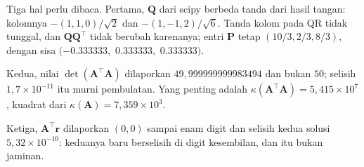Tiga hal perlu dibaca. Pertama, $\mathbf{Q}$ dari scipy berbeda tanda dari hasil tangan:
kolomnya $-(1,1,0)/\sqrt{2}$ dan $-(1,-1,2)/\sqrt{6}$. Tanda kolom pada QR tidak tunggal,
dan $\mathbf{Q}\mathbf{Q}^{\top}$ tidak berubah karenanya; entri $\mathbf{P}$ tetap
$(10/3,2/3,8/3)$, dengan sisa $(-0.333333,$ $0.333333,$ $0.333333)$.

Kedua, nilai $\det(\mathbf{A}^{\top}\mathbf{A})$ dilaporkan $49{,}999999999983494$ dan bukan
$50$; selisih $1{,}7\times10^{-11}$ itu murni pembulatan. Yang penting adalah
$\kappa(\mathbf{A}^{\top}\mathbf{A})=5{,}415\times10^{7}$, kuadrat dari
$\kappa(\mathbf{A})=7{,}359\times10^{3}$.

Ketiga, $\mathbf{A}^{\top}\mathbf{r}$ dilaporkan $(0,0)$ sampai enam digit dan selisih
kedua solusi $5{,}32\times10^{-10}$: keduanya baru berselisih di digit kesembilan, dan itu
bukan jaminan.

